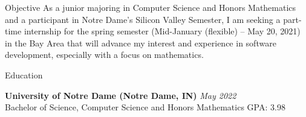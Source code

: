 \documentclass[10pt]{resume} %
\begin{document}
\begin{rSection}{Objective}
 As a junior majoring in Computer Science and Honors Mathematics and a participant in Notre Dame’s Silicon Valley Semester, I am seeking a part-time internship for the spring semester (Mid-January (flexible) – May 20, 2021) in the Bay Area that will advance my interest and experience in software development, especially with a focus on mathematics.
\end{rSection}




\begin{rSection}{Education}

{\bf University of Notre Dame (Notre Dame, IN) } \hfill { \em May 2022 } 
\\Bachelor of Science, Computer Science and Honors Mathematics\hfill { GPA: 3.98 }

\end{rSection}


\end{document}
